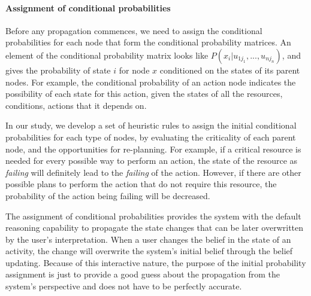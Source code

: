 \paragraph*{Assignment of conditional probabilities} %
\label{par:assignment_of_conditional_probabilities}
Before any propagation commences, we need to assign the conditional probabilities for each node that form the conditional probability matrices. An element of the conditional probability matrix looks like $P(x_i|u_{1j_1}, ..., u_{nj_n})$, and gives the probability of state $i$ for node $x$ conditioned on the states of its parent nodes. For example, the conditional probability of an action node indicates the possibility of each state for this action, given the states of all the resources, conditions, actions that it depends on. 


In our study, we develop a set of heuristic rules to assign the initial conditional probabilities for each type of nodes, by evaluating the criticality of each parent node, and the opportunities for re-planning. For example, if a critical resource is needed for every possible way to perform an action, the state of the resource as \emph{failing} will definitely lead to the \emph{failing} of the action. However, if there are other possible plans to perform the action that do not require this resource, the probability of the action being failing will be decreased.

The assignment of conditional probabilities provides the system with the default reasoning capability to propagate the state changes that can be later overwritten by the user's interpretation. When a user changes the belief in the state of an activity, the change will overwrite the system’s initial belief through the belief updating. Because of this interactive nature, the purpose of the initial probability assignment is just to provide a good guess about the propagation from the system's perspective and does not have to be perfectly accurate. 


